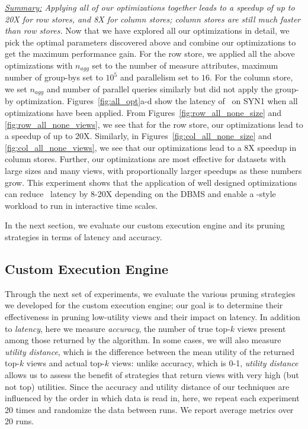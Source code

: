 {\em \underline{Summary:} Applying all of our optimizations together
leads to a speedup of up to 20X for row stores, and 8X for column stores;
column stores are still much faster than row stores.}
Now that we have explored all our optimizations in detail, we pick the optimal
parameters discovered above and combine our optimizations to get the maximum
performance gain. 
For the row store, we applied all the above optimizations with $n_{agg}$ set to
the number of measure attributes, maximum number of group-bys set to $10^5$ and
parallelism set to $16$.
For the column store, we set $n_{agg}$ and number of parallel queries similarly
but did not apply the group-by optimization. 
Figures~\ref{fig:all_opt}a-d show the latency of \SeeDB\ on SYN1 when all
optimizations have been applied.
From Figures~\ref{fig:row_all_none_size} and \ref{fig:row_all_none_views}, we
see that for the row store, our optimizations lead to a speedup of up to 20X.
Similarly, in Figures~\ref{fig:col_all_none_size}
and \ref{fig:col_all_none_views}, we see that our optimizations lead to a 8X
speedup in column stores. 
Further, our optimizations are most effective for datasets with large
sizes and many views, with proportionally larger speedups as these numbers grow.
This experiment shows that the application of well designed optimizations
can reduce \SeeDB\ latency by 8-20X depending on the DBMS and enable a
\SeeDB-style workload to run in interactive time scales.

In the next section, we evaluate our custom execution engine and
its pruning strategies in terms of latency and accuracy.

\subsection{Custom Execution Engine}
\label{sec:custom_execution_engine}

Through the next set of experiments, we evaluate the various pruning strategies
we developed for the custom execution engine; our goal is to determine
their effectiveness in pruning low-utility views and their impact on latency.
In addition to {\em latency}, here we measure {\em accuracy},
the number of true top-$k$ views present among those returned by the algorithm.
In some cases, we will also measure {\em utility distance},
which is the difference between the mean utility of the returned top-$k$ views
and actual top-$k$ views: unlike accuracy, which is 0-1, {\em utility distance}
allows us to assess the benefit of strategies that return views with very high 
(but not top) utilities.
Since the accuracy and utility distance of our techniques are influenced by the
order in which data is read in, here, we repeat each experiment 20
times and randomize the data between runs. We report average
metrics over 20 runs.

